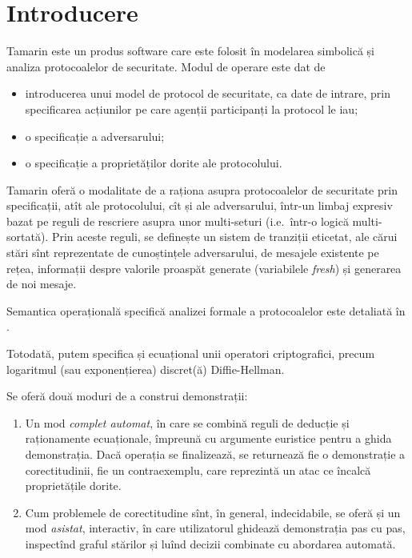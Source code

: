 
\chapter{Introducere}

Tamarin este un produs software care este folosit în modelarea simbolică
și analiza protocoalelor de securitate. Modul de operare este dat de
\begin{itemize}
    \item introducerea unui model de protocol de securitate, ca date de intrare,
        prin specificarea acțiunilor pe care agenții participanți la protocol
        le iau;
    \item o specificație a adversarului;
    \item o specificație a proprietăților dorite ale protocolului.
\end{itemize}

Tamarin oferă o modalitate de a raționa asupra protocoalelor de securitate
prin specificații, atît ale protocolului, cît și ale adversarului, într-un
limbaj expresiv bazat pe reguli de rescriere asupra unor multi-seturi
(i.e.\ într-o logică multi-sortată). Prin aceste reguli, se definește un
sistem de tranziții eticetat, ale cărui stări sînt reprezentate de
cunoștințele adversarului, de mesajele existente pe rețea, informații
despre valorile proaspăt generate (variabilele \emph{fresh}) și
generarea de noi mesaje.

Semantica operațională specifică analizei formale a protocoalelor
este detaliată în \cite[Cap.\ 3]{crem}.

Totodată, putem specifica și ecuațional unii operatori criptografici,
precum logaritmul (sau exponențierea) discret(ă) Diffie-Hellman.

Se oferă două moduri de a construi demonstrații:
\begin{enumerate}[(1)]
    \item Un mod \emph{complet automat}, în care se combină reguli
        de deducție și raționamente ecuaționale, împreună cu argumente
        euristice pentru a ghida demonstrația. Dacă operația se finalizează,
        se returnează fie o demonstrație a corectitudinii, fie un
        contraexemplu, care reprezintă un atac ce încalcă proprietățile
        dorite.
    \item Cum problemele de corectitudine sînt, în general, indecidabile,
        se oferă și un mod \emph{asistat}, interactiv, în care utilizatorul
        ghidează demonstrația pas cu pas, inspectînd graful stărilor și
        luînd decizii combinate cu abordarea automată.
\end{enumerate}


